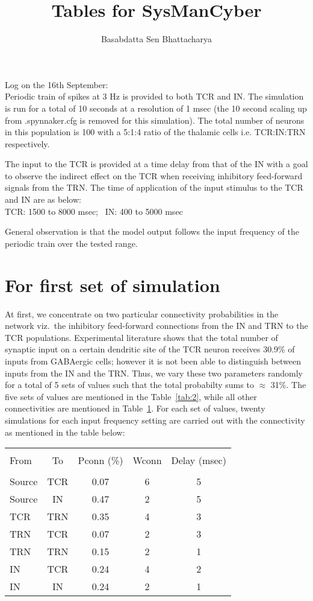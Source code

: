 \documentclass[11pt,a4paper]{article}
\author{Basabdatta Sen Bhattacharya}
\title{Tables for SysManCyber}
\begin{document}
Log on the 16th September:\\
Periodic train of spikes at 3 Hz is provided to both TCR and IN. The simulation is run for a total of 10 seconds at a resolution of 1 msec (the 10 second scaling up from .spynnaker.cfg is removed for this simulation). The total number of neurons in this population is 100 with a 5:1:4 ratio of the thalamic cells i.e. TCR:IN:TRN respectively.

The input to the TCR is provided at a time delay from that of the IN with a goal to observe the indirect effect on the TCR when receiving inhibitory feed-forward signals from the TRN. The time of application of the input stimulus to the TCR and IN are as below:\\
TCR: 1500 to 8000 msec; \, IN: 400 to 5000 msec

General observation is that the model output follows the input frequency of the periodic train over the tested range.
\section{For first set of simulation}
\label{sec:1}
At first, we concentrate on two particular connectivity probabilities in the network viz.\ the inhibitory feed-forward connections from the IN and TRN to the TCR populations. Experimental literature shows that the total number of synaptic input on a certain dendritic site of the TCR neuron receives 30.9\% of inputs from GABAergic cells; however it is not been able to distinguish between inputs from the IN and the TRN. Thus, we vary these two parameters randomly for a total of 5 sets of values such that the total probabilty sums to $\approx$ 31\%. The five sets of values are mentioned in the Table~\ref{tab:2}, while all other connectivities are mentioned in Table~\ref{tab:1}. For each set of values, twenty simulations for each input frequency setting are carried out with the connectivity as mentioned in the table below:
\begin{table}
\begin{tabular}{||l|c|c|c|c||}
\hline \\
From & To & Pconn (\%) & Wconn & Delay (msec) \\
\hline \hline \\
Source & TCR & 0.07 & 6 & 5\\
Source & IN & 0.47 & 2 & 5 \\
TCR & TRN & 0.35 & 4 & 3 \\
TRN & TCR & 0.07 & 2 & 3 \\
TRN & TRN & 0.15 & 2 & 1 \\
IN & TCR & 0.24 & 4 & 2 \\
IN & IN & 0.24 & 2 & 1 \\
\hline \hline
\end{tabular}
\label{tab:1}
\end{table}
\end{document}
